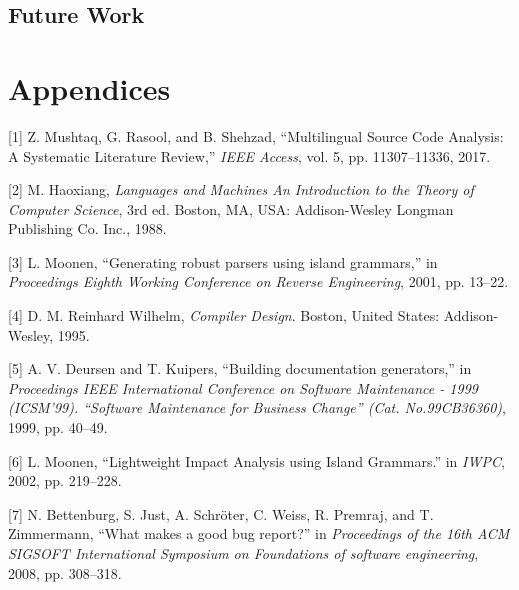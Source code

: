 \documentclass[conference,compsoc]{IEEEtran}
\begin{document}
\hypertarget{future-work}{%
\subsection{Future Work}\label{future-work}}

\appendix

\hypertarget{appendices}{%
\section*{Appendices}\label{appendices}}

\hypertarget{refs}{}
\leavevmode\hypertarget{ref-mushtaqMultilingualSourceCode2017}{}%
{[}1{]} Z. Mushtaq, G. Rasool, and B. Shehzad, ``Multilingual Source
Code Analysis: A Systematic Literature Review,'' \emph{IEEE Access},
vol. 5, pp. 11307--11336, 2017.

\leavevmode\hypertarget{ref-haoxiangLanguagesMachinesIntroduction1988}{}%
{[}2{]} M. Haoxiang, \emph{Languages and Machines An Introduction to the
Theory of Computer Science}, 3rd ed. Boston, MA, USA: Addison-Wesley
Longman Publishing Co. Inc., 1988.

\leavevmode\hypertarget{ref-moonenGeneratingRobustParsers2001}{}%
{[}3{]} L. Moonen, ``Generating robust parsers using island grammars,''
in \emph{Proceedings Eighth Working Conference on Reverse Engineering},
2001, pp. 13--22.

\leavevmode\hypertarget{ref-reinhardwilhelmCompilerDesign1995}{}%
{[}4{]} D. M. Reinhard Wilhelm, \emph{Compiler Design}. Boston, United
States: Addison-Wesley, 1995.

\leavevmode\hypertarget{ref-deursenBuildingDocumentationGenerators1999}{}%
{[}5{]} A. V. Deursen and T. Kuipers, ``Building documentation
generators,'' in \emph{Proceedings IEEE International Conference on
Software Maintenance - 1999 (ICSM'99). ``Software Maintenance for
Business Change'' (Cat. No.99CB36360)}, 1999, pp. 40--49.

\leavevmode\hypertarget{ref-moonenLightweightImpactAnalysis2002}{}%
{[}6{]} L. Moonen, ``Lightweight Impact Analysis using Island
Grammars.'' in \emph{IWPC}, 2002, pp. 219--228.

\leavevmode\hypertarget{ref-bettenburgWhatMakesGood2008}{}%
{[}7{]} N. Bettenburg, S. Just, A. Schröter, C. Weiss, R. Premraj, and
T. Zimmermann, ``What makes a good bug report?'' in \emph{Proceedings of
the 16th ACM SIGSOFT International Symposium on Foundations of software
engineering}, 2008, pp. 308--318.
\end{document}
